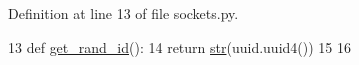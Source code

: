Definition at line 13 of file sockets.\+py.


\begin{DoxyCode}
13 \textcolor{keyword}{def }\hyperlink{namespaceparlai_1_1chat__service_1_1services_1_1websocket_1_1sockets_a474be2aef9361e19eacf308fbce1e802}{get\_rand\_id}():
14     \textcolor{keywordflow}{return} \hyperlink{namespacegenerate__task__READMEs_a5b88452ffb87b78c8c85ececebafc09f}{str}(uuid.uuid4())
15 
16 
\end{DoxyCode}
